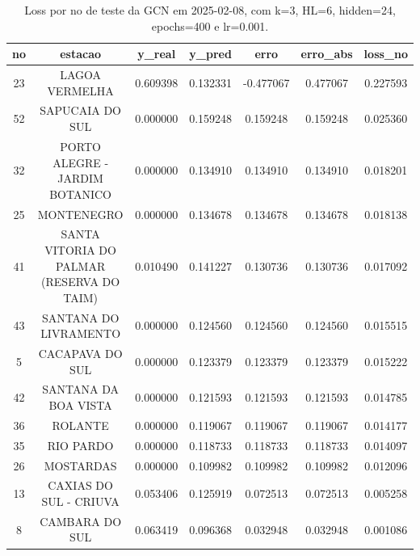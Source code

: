 \begin{table}[h]
\centering
\caption{Loss por no de teste da GCN em 2025-02-08, com k=3, HL=6, hidden=24, epochs=400 e lr=0.001.}
\label{tab:gcn_loss_k3_hl6_h24_e400_d20250208}
\begin{tabular}{ccccccc}
\toprule
no & estacao & y\_real & y\_pred & erro & erro\_abs & loss\_no \\
\midrule
23 & LAGOA VERMELHA & 0.609398 & 0.132331 & -0.477067 & 0.477067 & 0.227593 \\
52 & SAPUCAIA DO SUL & 0.000000 & 0.159248 & 0.159248 & 0.159248 & 0.025360 \\
32 & PORTO ALEGRE - JARDIM BOTANICO & 0.000000 & 0.134910 & 0.134910 & 0.134910 & 0.018201 \\
25 & MONTENEGRO & 0.000000 & 0.134678 & 0.134678 & 0.134678 & 0.018138 \\
41 & SANTA VITORIA DO PALMAR (RESERVA DO TAIM) & 0.010490 & 0.141227 & 0.130736 & 0.130736 & 0.017092 \\
43 & SANTANA DO LIVRAMENTO & 0.000000 & 0.124560 & 0.124560 & 0.124560 & 0.015515 \\
5 & CACAPAVA DO SUL & 0.000000 & 0.123379 & 0.123379 & 0.123379 & 0.015222 \\
42 & SANTANA DA BOA VISTA & 0.000000 & 0.121593 & 0.121593 & 0.121593 & 0.014785 \\
36 & ROLANTE & 0.000000 & 0.119067 & 0.119067 & 0.119067 & 0.014177 \\
35 & RIO PARDO & 0.000000 & 0.118733 & 0.118733 & 0.118733 & 0.014097 \\
26 & MOSTARDAS & 0.000000 & 0.109982 & 0.109982 & 0.109982 & 0.012096 \\
13 & CAXIAS DO SUL - CRIUVA & 0.053406 & 0.125919 & 0.072513 & 0.072513 & 0.005258 \\
8 & CAMBARA DO SUL & 0.063419 & 0.096368 & 0.032948 & 0.032948 & 0.001086 \\
\bottomrule
\end{tabular}
\end{table}
